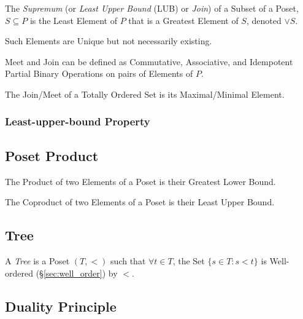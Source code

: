 The \emph{Supremum} (or \emph{Least Upper Bound} (LUB) or \emph{Join})
of a Subset of a Poset, $S \subseteq P$ is the Least Element of $P$
that is a Greatest Element of $S$, denoted $\vee S$.

Such Elements are Unique but not necessarily existing.

Meet and Join can be defined as Commutative, Associative, and
Idempotent Partial Binary Operations on pairs of Elements of $P$.

The Join/Meet of a Totally Ordered Set is its Maximal/Minimal Element.



\subsubsection{Least-upper-bound Property}\label{sec:leastupperbound_property}



\subsection{Poset Product}\label{sec:poset_product}

The Product of two Elements of a Poset is their Greatest Lower Bound.

The Coproduct of two Elements of a Poset is their Least Upper Bound.



\subsection{Tree}\label{sec:tree}

A \emph{Tree} is a Poset $(T,<)$ such that $\forall t \in T$, the Set
$\{s \in T : s < t \}$ is Well-ordered (\S\ref{sec:well_order}) by
$<$.



\subsection{Duality Principle}\label{sec:duality_principle}



